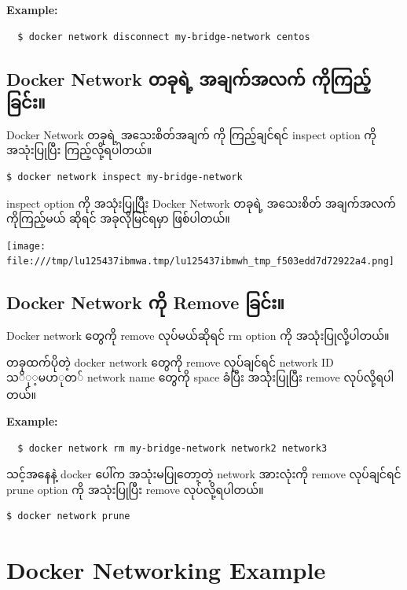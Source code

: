 \documentclass{article}
\begin{document}
\textbf{Example:}

\begin{verbatim}
  $ docker network disconnect my-bridge-network centos
\end{verbatim}

\subsection{Docker Network တခုရဲ့ အချက်အလက်
ကိုကြည့်ခြင်း။}\label{docker-network---}

Docker Network တခုရဲ့ အသေးစိတ်အချက် ကို ကြည့်ချင်ရင် inspect option ကို
အသုံးပြုပြီး ကြည့်လို့ရပါတယ်။

\begin{verbatim}
$ docker network inspect my-bridge-network
\end{verbatim}

inspect option ကို အသုံးပြုပြီး Docker Network တခုရဲ့ အသေးစိတ်
အချက်အလက်ကိုကြည့်မယ် ဆိုရင် အခုလိုမြင်ရမှာ ဖြစ်ပါတယ်။

\texttt{[image: file:///tmp/lu125437ibmwa.tmp/lu125437ibmwh\_tmp\_f503edd7d72922a4.png]}

\subsection{Docker Network ကို Remove
ခြင်း။}\label{docker-network--remove-}

Docker network တွေကို remove လုပ်မယ်ဆိုရင် rm option ကို
အသုံးပြုလို့ပါတယ်။

တခုထက်ပိုတဲ့ docker network တွေကို remove လုပ်ချင်ရင် network ID
$သို့မဟုတ်$ network name တွေကို space ခံပြီး အသုံးပြုပြီး remove
လုပ်လို့ရပါတယ်။

\textbf{Example:}

\begin{verbatim}
  $ docker network rm my-bridge-network network2 network3
\end{verbatim}

သင့်အနေနဲ့ docker ပေါ်က အသုံးမပြုတော့တဲ့ network အားလုံးကို remove
လုပ်ချင်ရင် prune option ကို အသုံးပြုပြီး remove လုပ်လို့ရပါတယ်။

\begin{verbatim}
$ docker network prune
\end{verbatim}

\pagebreak

\section{Docker Networking Example}\label{docker-networking-example}
\end{document}
